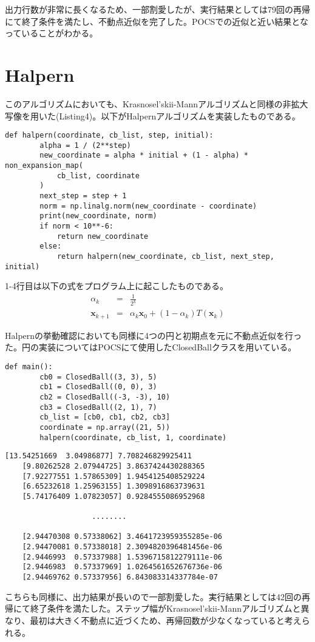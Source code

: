 \documentclass{jsarticle}
\begin{document}
\par 出力行数が非常に長くなるため、一部割愛したが、実行結果としては79回の再帰にて終了条件を満たし、不動点近似を完了した。POCSでの近似と近い結果となっていることがわかる。
\section*{Halpern}
このアルゴリズムにおいても、Krasnosel'skii-Mannアルゴリズムと同様の非拡大写像を用いた(Listing4)。以下がHalpernアルゴリズムを実装したものである。
\begin{lstlisting}[caption = Halpern メソッド]
    def halpern(coordinate, cb_list, step, initial):
        alpha = 1 / (2**step)
        new_coordinate = alpha * initial + (1 - alpha) * non_expansion_map(
            cb_list, coordinate
        )
        next_step = step + 1
        norm = np.linalg.norm(new_coordinate - coordinate)
        print(new_coordinate, norm)
        if norm < 10**-6:
            return new_coordinate
        else:
            return halpern(new_coordinate, cb_list, next_step, initial)
\end{lstlisting}
\par 1-4行目は以下の式をプログラム上に起こしたものである。
\begin{eqnarray}
    \alpha_k &=& \frac{1}{2^k} \nonumber \\
    \bm{x}_{k+1} &=& \alpha_k\bm{x}_0 + (1 - \alpha_k)T(\bm{x}_k) \nonumber
\end{eqnarray}
\par Halpernの挙動確認においても同様に4つの円と初期点を元に不動点近似を行った。円の実装についてはPOCSにて使用したClosedBallクラスを用いている。
\begin{lstlisting}[caption = main文]
    def main():
        cb0 = ClosedBall((3, 3), 5)
        cb1 = ClosedBall((0, 0), 3)
        cb2 = ClosedBall((-3, -3), 10)
        cb3 = ClosedBall((2, 1), 7)
        cb_list = [cb0, cb1, cb2, cb3]
        coordinate = np.array((21, 5))
        halpern(coordinate, cb_list, 1, coordinate)
\end{lstlisting}
\begin{lstlisting}[caption = 出力結果]
    [13.54251669  3.04986877] 7.708246829925411
    [9.80262528 2.07944725] 3.8637424430288365
    [7.92277551 1.57865309] 1.9454125408529224
    [6.65232618 1.25963155] 1.3098916863739631
    [5.74176409 1.07823057] 0.9284555086952968
    
                    ........

    [2.94470308 0.57338062] 3.4641723959355285e-06
    [2.94470081 0.57338018] 2.3094820396481456e-06
    [2.9446993  0.57337988] 1.5396715812279111e-06
    [2.9446983  0.57337969] 1.0264561652676736e-06
    [2.94469762 0.57337956] 6.843083314337784e-07
\end{lstlisting}
\par こちらも同様に、出力結果が長いので一部割愛した。実行結果としては42回の再帰にて終了条件を満たした。ステップ幅がKrasnosel'skii-Mannアルゴリズムと異なり、最初は大きく不動点に近づくため、再帰回数が少なくなっていると考えられる。
\end{document}
